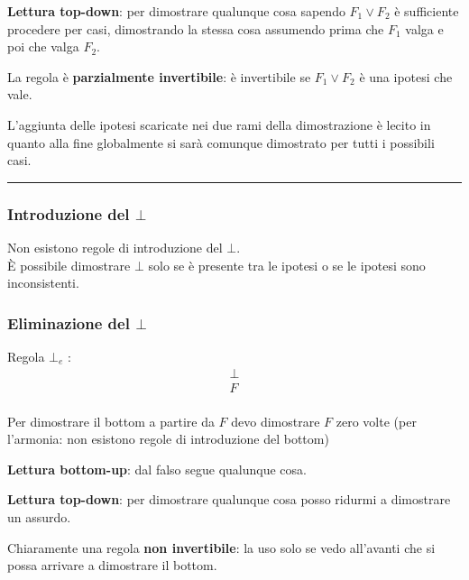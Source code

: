 \documentclass[
  a4paper,
]{article}
\begin{document}
\textbf{Lettura top-down}: per dimostrare qualunque cosa sapendo
\(F_1 \lor F_2\) è sufficiente procedere per casi, dimostrando la stessa
cosa assumendo prima che \(F_1\) valga e poi che valga \(F_2\).

La regola è \textbf{parzialmente invertibile}: è invertibile se
\(F_1 \lor F_2\) è una ipotesi che vale.

L'aggiunta delle ipotesi scaricate nei due rami della dimostrazione è
lecito in quanto alla fine globalmente si sarà comunque dimostrato per
tutti i possibili casi.

\par\noindent\rule{\linewidth}{0.4pt}\par\vspace{6pt}

\hypertarget{introduzione-del-bot}{%
\subsubsection{\texorpdfstring{Introduzione del
\(\bot\)}{Introduzione del \textbackslash bot}}\label{introduzione-del-bot}}

Non esistono regole di introduzione del \(\bot\).\\
È possibile dimostrare \(\bot\) solo se è presente tra le ipotesi o se
le ipotesi sono inconsistenti.

\hypertarget{eliminazione-del-bot}{%
\subsubsection{\texorpdfstring{Eliminazione del
\(\bot\)}{Eliminazione del \textbackslash bot}}\label{eliminazione-del-bot}}

Regola \(\bot_e\) : \[
\begin{matrix} 
\bot \\
\hline
F \\
\end{matrix}
\]

Per dimostrare il bottom a partire da \(F\) devo dimostrare \(F\) zero
volte (per l'armonia: non esistono regole di introduzione del bottom)

\textbf{Lettura bottom-up}: dal falso segue qualunque cosa.

\textbf{Lettura top-down}: per dimostrare qualunque cosa posso ridurmi a
dimostrare un assurdo.

Chiaramente una regola \textbf{non invertibile}: la uso solo se vedo
all'avanti che si possa arrivare a dimostrare il bottom.
\end{document}
